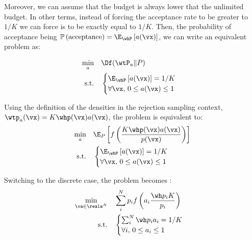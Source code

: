 \documentclass[twoside]{article}
\begin{document}
Moreover, we can assume that the budget is always lower that the unlimited budget. In other terms, instead of forcing the acceptance rate to be greater to $1/K$ we can force is to be exactly equal to $1/K$. Then, the probability of acceptance being $\mathbb{P}\left(\mbox{acceptance}\right) = \E_{\whP}\left[a(\vx)\right]$,  we can write an equivalent problem as: 

\begin{align}
	\begin{split}
		\min_a & \quad\Df(\wtP_a\Vert P ) \\
		\mbox{s.t.} &\quad \begin{cases} \E_{\whP}\left[a(\vx)\right] = 1/K \\
		\forall \vx, \, 0\leq a(\vx) \leq 1 \end{cases}
	\end{split}
\end{align}

Using the definition of the densities in the rejection sampling context, $\wtp_a(\vx) = K\whp(\vx)a(\vx)$, the problem is equivalent to:
\begin{align}
	\begin{split}
		\min_a & \quad \E_{P}\left[f\left(\frac{K\whp(\vx)a(\vx)}{p(\vx)}\right)\right] \\
		\mbox{s.t.} &\quad \begin{cases} \E_{\whP}\left[a(\vx)\right]= 1/K \\
		\forall \vx, \, 0\leq a(\vx) \leq 1 \end{cases}
	\end{split}
\end{align}

Switching to the discrete case, the problem becomes :
\begin{align}
\begin{split}
\label{eq:app:discreteprob}
	\min_{\va\in \reals^N} & \quad \sum_i^N p_i f\left(a_i \frac{\wh p_iK}{p_i}\right)  \\
    \mbox{s.t.} &\quad  \begin{cases} \sum_i^N \wh p_i a_i = 1/K \\
     \forall i, \, 0\leq a_i \leq 1   \end{cases}
\end{split}
\end{align}
\end{document}
